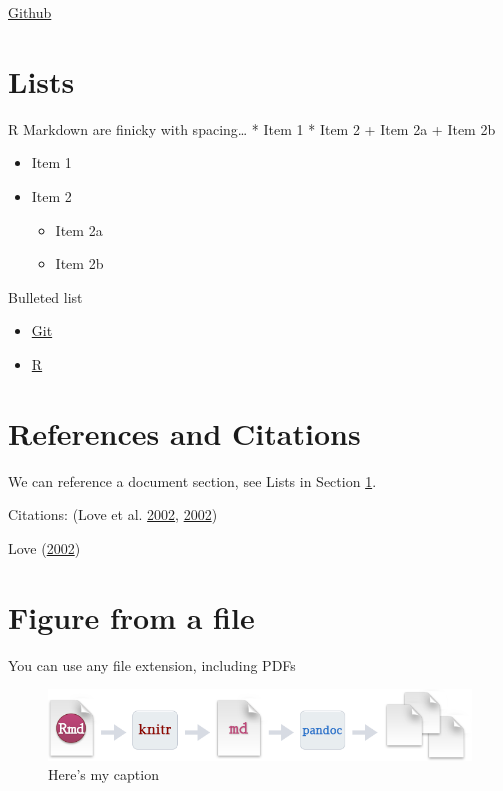 \documentclass[12pt,]{article}
\providecommand{\tightlist}{%
  \setlength{\itemsep}{0pt}\setlength{\parskip}{0pt}}
\begin{document}
\href{www.github.com}{Github}

\section{Lists}\label{lists}

R Markdown are finicky with spacing\ldots{} * Item 1 * Item 2 + Item 2a
+ Item 2b

\begin{itemize}
\tightlist
\item
  Item 1
\item
  Item 2

  \begin{itemize}
  \tightlist
  \item
    Item 2a
  \item
    Item 2b
  \end{itemize}
\end{itemize}

Bulleted list

\begin{itemize}[noitemsep,nolistsep,topsep=0pt]

\item \href{https://git-scm.com/book/en/v2/Getting-Started-Installing-Git}{Git}

\item \href{https://cran.r-project.org/bin/windows/base/}{R}

\end{itemize}

\section{References and Citations}\label{references-and-citations}

We can reference a document section, see Lists in Section \ref{lists}.

Citations: (Love et al. \protect\hyperlink{ref-Love2002}{2002},
\protect\hyperlink{ref-Love2002}{2002})

Love (\protect\hyperlink{ref-Love2002}{2002})

\section{Figure from a file}\label{figure-from-a-file}

You can use any file extension, including PDFs

\begin{figure}[htbp]
\centering
\includegraphics{RMarkdownFLow.png}
\caption{Here's my caption \label{fig:fig_example}}
\end{figure}
\end{document}
